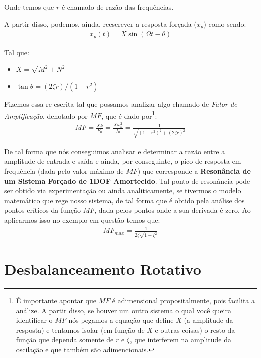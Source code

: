 \documentclass{article}
\begin{document}
            Onde temos que $r$ é chamado de razão das frequências.

            A partir disso, podemos, ainda, reescrever a resposta forçada ($x_p$) como sendo:
            \begin{align}
                x_p(t) = X\sin(\Omega t - \theta)
            \end{align}

            Tal que:
            \begin{itemize}
                \item $X = \sqrt{M^2 + N^2}$
                \item $\tan{\theta} = (2\zeta r)/(1-r^2)$
            \end{itemize}

            Fizemos essa re-escrita tal que possamos analizar algo chamado de \emph{Fator de Amplificação}, denotado por \textbf{$MF$}, que é dado por\footnote{É importante apontar que $MF$ é
            adimensional propositalmente, pois facilita a análize. A partir disso, se houver um outro sistema o qual você queira identificar o $MF$ nós pegamos a equação que define $X$ (a amplitude da
            resposta) e tentamos isolar (em função de $X$ e outras coisas) o resto da função que dependa somente de $r$ e $\zeta$, que interferem na amplitude da oscilação e que também são adimencionais.}:
            \begin{align}
                MF = \frac{Xk}{F_0} = \frac{X\omega_n^2}{f_0} = \frac{1}{\sqrt{(1 - r^2)^2 + (2\zeta r)^2}}\label{eq:fator_de_amplificacao}
            \end{align}

            De tal forma que nós conseguimos analisar e determinar a razão entre a amplitude de entrada e saída e ainda, por conseguinte, o pico de resposta em frequência (dada pelo valor máximo de $MF$) que corresponde a \textbf{Resonância de um Sistema Forçado de 1DOF
            Amortecido}. Tal ponto de resonância pode ser obtido via experimentação ou ainda analiticamente, se tivermos o modelo matemático que rege nosso sistema, de tal forma que é obtido pela análise
            dos pontos críticos da função $MF$, dada pelos pontos onde a sua derivada é zero. Ao aplicarmos isso no exemplo em questão temos que:
            \begin{align}
                MF_{max} = \frac{1}{2\zeta\sqrt{1-\zeta^2}}
            \end{align}

        \section{Desbalanceamento Rotativo}







            
\end{document}
